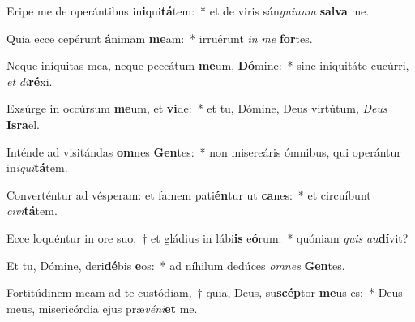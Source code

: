\item Eripe me de operántibus in\textbf{i}qui\textbf{tá}tem:~* et de viris sán\textit{gui}\textit{num} \textbf{sal}\textbf{va} me.
\item Quia ecce cepérunt \textbf{á}nimam \textbf{me}am:~* irruérunt \textit{in} \textit{me} \textbf{for}tes.
\item Neque iníquitas mea, neque peccátum \textbf{me}um, \textbf{Dó}mine:~* sine iniquitáte cucúrri, \textit{et} \textit{di}\textbf{ré}xi.
\item Exsúrge in occúrsum \textbf{me}um, et \textbf{vi}de:~* et tu, Dómine, Deus virtútum, \textit{De}\textit{us} \textbf{Is}\textbf{ra}ël.
\item Inténde ad visitándas \textbf{om}nes \textbf{Gen}tes:~* non misereáris ómnibus, qui operántur in\textit{i}\textit{qui}\textbf{tá}tem.
\item Converténtur ad vésperam: et famem pati\textbf{én}tur ut \textbf{ca}nes:~* et circuíbunt \textit{ci}\textit{vi}\textbf{tá}tem.
\item Ecce loquéntur in ore suo,~† et gládius in lábi\textbf{is} e\textbf{ó}rum:~* quóniam \textit{quis} \textit{au}\textbf{dí}vit?
\item Et tu, Dómine, deri\textbf{dé}bis \textbf{e}os:~* ad níhilum dedúces \textit{om}\textit{nes} \textbf{Gen}tes.
\item Fortitúdinem meam ad te custódiam,~† quia, Deus, su\textbf{scép}tor \textbf{me}us es:~* Deus meus, misericórdia ejus præ\textit{vé}\textit{ni}\textbf{et} me.
